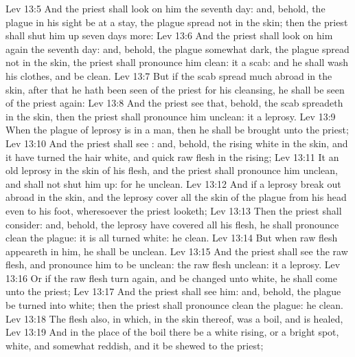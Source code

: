 \vs Lev 13:5 And the priest shall look on him the seventh day: and, behold,  the plague in his sight be at a stay,  the plague spread not in the skin; then the priest shall shut him up seven days more:
\vs Lev 13:6 And the priest shall look on him again the seventh day: and, behold,  the plague  somewhat dark,  the plague spread not in the skin, the priest shall pronounce him clean: it  a scab: and he shall wash his clothes, and be clean.
\vs Lev 13:7 But if the scab spread much abroad in the skin, after that he hath been seen of the priest for his cleansing, he shall be seen of the priest again:
\vs Lev 13:8 And  the priest see that, behold, the scab spreadeth in the skin, then the priest shall pronounce him unclean: it  a leprosy.
\vs Lev 13:9 When the plague of leprosy is in a man, then he shall be brought unto the priest;
\vs Lev 13:10 And the priest shall see : and, behold,  the rising  white in the skin, and it have turned the hair white, and  quick raw flesh in the rising;
\vs Lev 13:11 It  an old leprosy in the skin of his flesh, and the priest shall pronounce him unclean, and shall not shut him up: for he  unclean.
\vs Lev 13:12 And if a leprosy break out abroad in the skin, and the leprosy cover all the skin of  the plague from his head even to his foot, wheresoever the priest looketh;
\vs Lev 13:13 Then the priest shall consider: and, behold,  the leprosy have covered all his flesh, he shall pronounce  clean  the plague: it is all turned white: he  clean.
\vs Lev 13:14 But when raw flesh appeareth in him, he shall be unclean.
\vs Lev 13:15 And the priest shall see the raw flesh, and pronounce him to be unclean:  the raw flesh  unclean: it  a leprosy.
\vs Lev 13:16 Or if the raw flesh turn again, and be changed unto white, he shall come unto the priest;
\vs Lev 13:17 And the priest shall see him: and, behold,  the plague be turned into white; then the priest shall pronounce  clean  the plague: he  clean.
\vs Lev 13:18 The flesh also, in which,  in the skin thereof, was a boil, and is healed,
\vs Lev 13:19 And in the place of the boil there be a white rising, or a bright spot, white, and somewhat reddish, and it be shewed to the priest;
